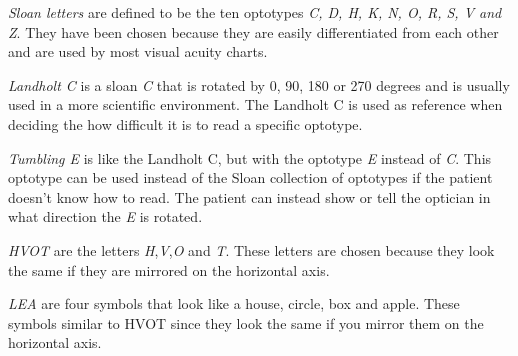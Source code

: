 \documentclass[12pt,a4paper,notitlepage]{report}
\begin{document}
\textit{Sloan letters} are defined to be the ten optotypes \textit{C, D, H, K, N, O, R, S, V and Z}. They have been chosen because they are easily differentiated from each other \cite{Ferris} and are used by most visual acuity charts\cite{Colenbrander}.

\textit{Landholt C} is a sloan \textit{C} that is rotated by 0, 90, 180 or 270 degrees and is usually used in a more scientific environment. The Landholt C is used as reference when deciding the how difficult it is to read a specific optotype\cite{Colenbrander}.

\textit{Tumbling E} is like the Landholt C, but with the optotype \textit{E} instead of \textit{C}. This optotype can be used instead of the Sloan collection of optotypes if the patient doesn't know how to read. The patient can instead show or tell the optician in what direction the \textit{E} is rotated\cite{Colenbrander}.

\textit{HVOT} are the letters \textit{H},\textit{V},\textit{O} and \textit{T}. These letters are chosen because they look the same if they are mirrored on the horizontal axis.

\textit{LEA} are four symbols that look like a house, circle, box and apple. These symbols similar to HVOT since they look the same if you mirror them on the horizontal axis.
\end{document}
